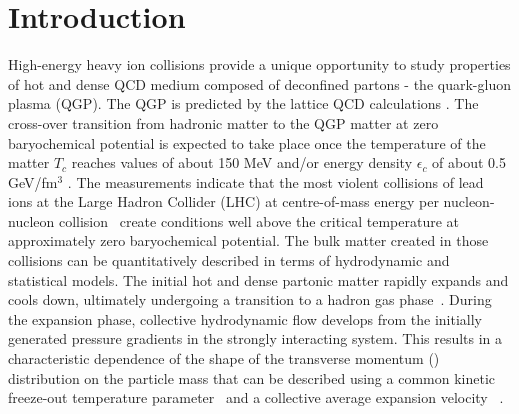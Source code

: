 

\section{Introduction}

High-energy heavy ion collisions provide a unique opportunity to study properties of hot and dense QCD medium composed of deconfined partons - the quark-gluon plasma (QGP). 
The QGP is predicted by the lattice QCD calculations \cite{Satz:2000bn,Bass:1998vz,Shuryak:1984nq,Cleymans:1985wb}. 
The cross-over transition from hadronic matter to the QGP matter at zero baryochemical potential is expected to take place once the temperature of the matter $T_{c}$ reaches values of about 150 MeV and/or energy density $\epsilon_{c}$ of about 0.5 GeV/fm$^3$ \cite{Borsanyi:2010cj,Bhattacharya:2014ara}. 
The measurements indicate that the most violent collisions of lead ions at the Large Hadron Collider (LHC) at
centre-of-mass energy per nucleon-nucleon collision \ create conditions well above the critical temperature at approximately zero baryochemical potential.
The bulk matter created in those collisions can be quantitatively described in terms of hydrodynamic and statistical
models. 
The initial hot and dense partonic matter rapidly expands and cools down, ultimately undergoing a transition to a hadron gas phase~\cite{Muller:2006ee}. 
During the expansion phase, collective hydrodynamic flow develops from the initially generated pressure gradients in the strongly interacting system. 
This results in a characteristic dependence of the shape of the transverse momentum (\pt) distribution on the particle mass that can be described using a common kinetic freeze-out temperature parameter \Tfo\ and a collective average expansion velocity \avbT~\cite{Schnedermann:1993ws}.

